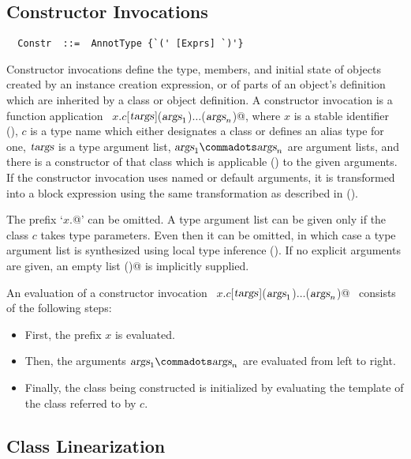 \subsection{Constructor Invocations}
\label{sec:constr-invoke}
\syntax\begin{lstlisting}
  Constr  ::=  AnnotType {`(' [Exprs] `)'}
\end{lstlisting}

Constructor invocations define the type, members, and initial state of
objects created by an instance creation expression, or of parts of an
object's definition which are inherited by a class or object
definition. A constructor invocation is a function application
~\lstinline@$x$.$c$[$\mbox{\sl targs}$]($\mbox{\sl args}_1$)$\ldots$($\mbox{\sl args}_n$)@, where $x$ is a stable identifier
(), $c$ is a type name which either designates a
class or defines an alias type for one, $\mbox{\sl targs}$ is a type argument
list, $\args_1 \commadots \args_n$ are argument lists, and there is a
constructor of that class which is applicable ()
to the given arguments. If the constructor invocation uses named or
default arguments, it is transformed into a block expression using the
same transformation as described in ().

The prefix `\lstinline@$x$.@' can be omitted.  A type argument list
can be given only if the class $c$ takes type parameters.  Even then
it can be omitted, in which case a type argument list is synthesized
using local type inference (). If no explicit
arguments are given, an empty list \lstinline@()@ is implicitly supplied.

An evaluation of a constructor invocation 
~\lstinline@$x$.$c$[$\mbox{\sl targs}$]($\mbox{\sl args}_1$)$\ldots$($\mbox{\sl args}_n$)@~
consists of the following steps:
\begin{itemize}
\item First, the prefix $x$ is evaluated.
\item Then, the arguments $\args_1 \commadots \args_n$ are evaluated from left to right.
\item Finally, the class being constructed is initialized by evaluating the
  template of the class referred to by $c$.
\end{itemize}

\subsection{Class Linearization}\label{sec:linearization}

